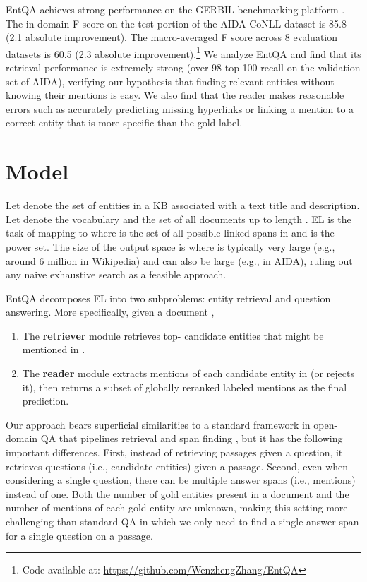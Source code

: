 \documentclass{article} \clearpage{}\usepackage{amsmath,amssymb,amsthm,bbm}
\theoremstyle{definition}
\begin{document}
EntQA achieves strong performance on the GERBIL benchmarking platform \citep{roder2018gerbil}.
The in-domain F score on the test portion of the AIDA-CoNLL dataset is 85.8 (2.1 absolute improvement).
The macro-averaged F score across 8 evaluation datasets is 60.5 (2.3 absolute improvement).\footnote{Code available at: \url{https://github.com/WenzhengZhang/EntQA}}
We analyze EntQA and find that its retrieval performance is extremely strong (over 98 top-100 recall on the validation set of AIDA),
verifying our hypothesis that finding relevant entities without knowing their mentions is easy.
We also find that the reader makes reasonable errors such as accurately predicting missing hyperlinks or linking a mention to a correct entity that is more specific than the gold label.


\section{Model}
\label{sec:model}

Let  denote the set of entities in a KB associated with a text title and description.
Let  denote the vocabulary and  the set of all documents up to length .
EL is the task of mapping  to  where
 is the set of all possible linked spans in  and  is the power set.
The size of the output space is  where  is typically very large (e.g., around 6 million in Wikipedia)
and  can also be large (e.g.,  in AIDA), ruling out any naive exhaustive search as a feasible approach.

EntQA decomposes EL into two subproblems: entity retrieval and question answering.
More specifically, given a document ,
\begin{enumerate}
\item The \textbf{retriever} module retrieves top- candidate entities that might be mentioned in .
\item The \textbf{reader} module extracts mentions of each candidate entity in  (or rejects it), then returns a subset of globally reranked labeled mentions as the final prediction.
\end{enumerate}
Our approach bears superficial similarities to a standard framework in open-domain QA that pipelines retrieval and span finding \citep[\textit{inter alia}]{karpukhin2020dense},
but it has the following important differences.
First, instead of retrieving passages given a question, it retrieves questions (i.e., candidate entities) given a passage.
Second, even when considering a single question, there can be multiple answer spans (i.e., mentions) instead of one.
Both the number of gold entities present in a document and the number of mentions of each gold entity are unknown,
making this setting more challenging than standard QA in which we only need to find a single answer span for a single question on a passage.
\end{document}
